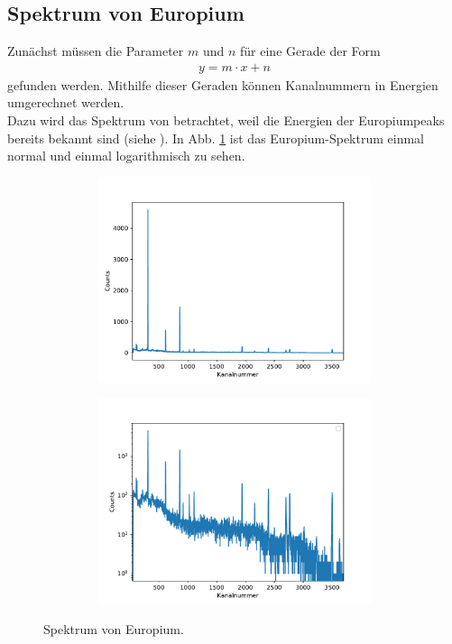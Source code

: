   \subsection{Spektrum von Europium}

   \raggedright

    Zunächst müssen die Parameter
    $m$ und $n$ für eine Gerade der Form
    \begin{align*}
      y = m\cdot x+n
    \end{align*}
    gefunden werden. Mithilfe dieser Geraden können Kanalnummern in
    Energien umgerechnet werden.\\
    Dazu wird das Spektrum von  betrachtet, weil die Energien
    der Europiumpeaks bereits bekannt sind (siehe \cite{anleitungv18}).
    In Abb. \ref{fig:euro} ist das Europium-Spektrum einmal
    normal und einmal logarithmisch zu sehen.



    \begin{figure}[H]
      \centering
      \begin{subfigure}{0.495\textwidth}
        \centering
        \includegraphics[height=6cm, width = 1\textwidth]{germania/eu_allgemein/europium.pdf}
      \end{subfigure}
      \begin{subfigure}{0.495\textwidth}
        \centering
        \includegraphics[height=6cm, width = 1\textwidth]{germania/eu_allgemein/europilog.pdf}
      \end{subfigure}
      \caption{Spektrum von Europium.}
      \label{fig:euro}
    \end{figure}

